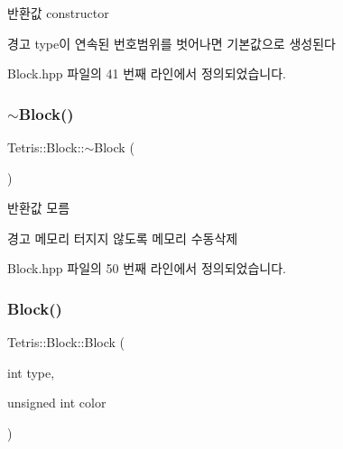 \begin{DoxyReturn}{반환값}
constructor 
\end{DoxyReturn}
\begin{DoxyWarning}{경고}
type이 연속된 번호범위를 벗어나면 기본값으로 생성된다 
\end{DoxyWarning}


Block.\+hpp 파일의 41 번째 라인에서 정의되었습니다.

\mbox{\label{class_tetris_1_1_block_a20012167d55a996d56825d99082419c6}} 
\subsubsection{\texorpdfstring{$\sim$\+Block()}{~Block()}\hspace{0.1cm}{\footnotesize\ttfamily [2/2]}}
{\footnotesize\ttfamily Tetris\+::\+Block\+::$\sim$\+Block (\begin{DoxyParamCaption}{ }\end{DoxyParamCaption})\hspace{0.3cm}{\ttfamily [inline]}}

\begin{DoxyReturn}{반환값}
모름 
\end{DoxyReturn}
\begin{DoxyWarning}{경고}
메모리 터지지 않도록 메모리 수동삭제 
\end{DoxyWarning}


Block.\+hpp 파일의 50 번째 라인에서 정의되었습니다.

\mbox{\label{class_tetris_1_1_block_a82c3ff96d106bd1da7b32f2addd7db7f}} 
\subsubsection{\texorpdfstring{Block()}{Block()}\hspace{0.1cm}{\footnotesize\ttfamily [4/4]}}
{\footnotesize\ttfamily Tetris\+::\+Block\+::\+Block (\begin{DoxyParamCaption}\item[{int}]{type,  }\item[{unsigned int}]{color }\end{DoxyParamCaption})\hspace{0.3cm}{\ttfamily [inline]}}

